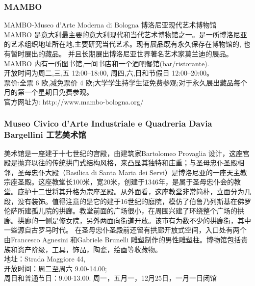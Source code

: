 \subsubsection{MAMBO}
MAMBO-Museo d’Arte Moderna di Bologna 博洛尼亚现代艺术博物馆\\
MAMBO 是意大利最主要的意大利现代和当代艺术博物馆之一。是一所博洛尼亚的艺术组织地址所在地,主要研究当代艺术。现有展品既有永久保存在博物馆的, 也有暂时展出的藏品。 并且长期展出博洛尼亚世界著名艺术家莫兰迪的展品。\\ 
MAMBO 内有一所图书馆,一间书店和一个酒吧餐馆(bar/ristorante). \\
开放时间为周二,三,五 12:00--18:00, 周四,六,日和节假日 12:00--20:00。\\
票价:全票 6 欧,减免票价 4 欧;大学学生持学生证免费参观;对于永久展出藏品每个月的第一个星期日免费参观。\\
官方网址为: http://www.mambo-bologna.org/

\subsubsection{Museo Civico d'Arte Industriale e Quadreria Davia Bargellini  工艺美术馆}
美术馆是一座建于十七世纪的宫殿，由建筑家Bartolomeo Provaglia 设计，这座宫殿是抛弃以往的传统拱门式结构风格，来凸显其独特和庄重；与圣母忠仆圣殿相邻，圣母忠仆大殿（Basilica di Santa Maria dei Servi）是博洛尼亚的一座天主教宗座圣殿。这座教堂长100米，宽20米，创建于1346年，是属于圣母忠仆会的教堂。庇护十二世将其升格为宗座圣殿。从外面看，这座教堂非常简朴，立面分为几段，没有装饰。值得注意的是它的建于16世纪的庭院，模仿了伯鲁乃列斯基在佛罗伦萨所建孤儿院的拱廊。教堂前面的广场很小，在周围兴建了环绕整个广场的拱廊。拱廊的一侧是修女院，另外两面向街道开放。该市有为数不少的拱廊街，其中一些源自古罗马时代。
在圣母忠仆圣殿前还留有拱廊开放式空间，入口处有两个由Francesco Agnesini 和Gabriele Brunelli 雕塑制作的男性雕塑柱。博物馆包括贵族和资产阶级，工具，饰品，陶瓷，绘画等收藏物。\\
地址：Strada Maggiore 44,\\
开放时间：周二至周六 9.00-14.00; \\
周日和普通节日：9.00-13.00.  周一，五月一，12月25日，一月一日闭馆 